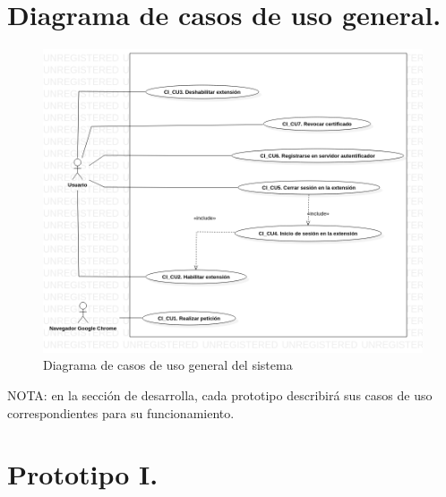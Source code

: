 \documentclass[12pt, a4paper, titlepage]{report}
\begin{document}
	    \section{Diagrama de casos de uso general.}
	         \begin{figure}[H]
        		\begin{center}
        		\includegraphics[width=13cm]{./imagenes/Analisis/UCD_General.png}
        		\caption{Diagrama de casos de uso general del sistema}
	            \end{center}
	        \end{figure}   
	        
	        NOTA: en la sección de desarrolla, cada prototipo describirá sus casos de uso correspondientes para su funcionamiento.
	        
		\section{Prototipo I.}
\end{document}
